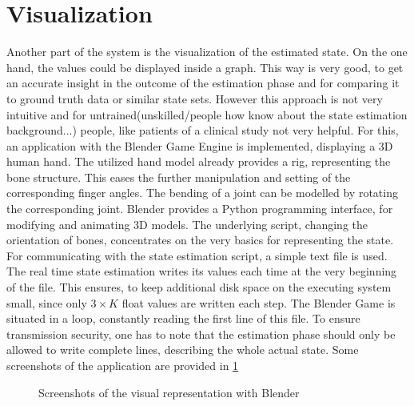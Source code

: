 \section{Visualization} \label{sec:visual}

Another part of the system is the visualization of the estimated state. On the one hand, the values could be displayed inside a graph. This way is very good, to get an accurate insight in the outcome of the estimation phase and for comparing it to ground truth data or similar state sets. However this approach is not very intuitive and for untrained(unskilled/people how know about the state estimation background...) people, like patients of a clinical study not very helpful. For this, an application with the Blender Game Engine \cite{blender} is implemented, displaying a 3D human hand. The utilized hand model already provides a rig, representing the bone structure. This eases the further manipulation and setting of the corresponding finger angles. The bending of a joint can be modelled by rotating the corresponding joint. Blender provides a Python programming interface, for modifying and animating 3D models. The underlying script, changing the orientation of bones, concentrates on the very basics for representing the state. For communicating with the state estimation script, a simple text file is used. The real time state estimation writes its values each time at the very beginning of the file. This ensures, to keep additional disk space on the executing system small, since only $ 3 \times K $ float values are written each step. The Blender Game is situated in a loop, constantly reading the first line of this file. To ensure transmission security, one has to note that the estimation phase should only be allowed to write complete lines, describing the whole actual state. Some screenshots of the application are provided in \ref{fig:blendGame}

\begin{figure}[h]
\centering
	\hfill
\caption{Screenshots of the visual representation with Blender}
\label{fig:blendGame}
\end{figure}
